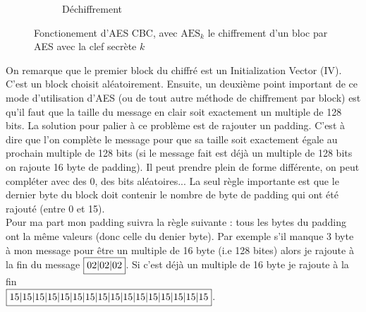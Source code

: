 \documentclass[a4paper, 12pt]{article}
\begin{document}
\begin{figure}[h]
\begin{subfigure}{\textwidth}
\caption{Déchiffrement}
\end{subfigure}
\caption{Fonctionement d'AES CBC, avec $\text{AES}_k$ le chiffrement d'un bloc par AES avec la clef secrète $k$}
\label{ilu_cbc}
\end{figure}

On remarque que le premier block du chiffré est un Initialization Vector (IV). C'est un block choisit aléatoirement. Ensuite, un deuxième point important de ce mode d'utilisation d'AES (ou de tout autre méthode de chiffrement par block) est qu'il faut que la taille du message en clair soit exactement un multiple de 128 bits. La solution pour palier à ce problème est de rajouter un padding. C'est à dire que l'on complète le message pour que sa taille soit exactement égale au prochain multiple de 128 bits (si le message fait est déjà un multiple de 128 bits on rajoute 16 byte de padding). Il peut prendre plein de forme différente, on peut compléter avec des $0$, des bits aléatoires... La seul règle importante est que le dernier byte du block doit contenir le nombre de byte de padding qui ont été rajouté (entre 0 et 15). \\

Pour ma part mon padding suivra la règle suivante : tous les bytes du padding ont la même valeurs (donc celle du denier byte).
Par exemple s'il manque 3 byte à mon message pour être un multiple de 16 byte (i.e 128 bites) alors je rajoute à la fin du message $\fbox{02|02|02}$. Si c'est déjà un multiple de 16 byte je rajoute à la fin\\ $\fbox{15|15|15|15|15|15|15|15|15|15|15|15|15|15|15|15}$.\\
\end{document}
